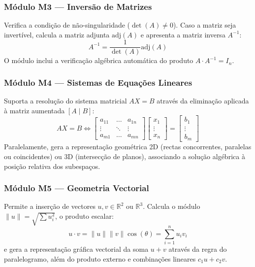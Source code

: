 \documentclass[conference]{IEEEtran}
\begin{document}
\subsubsection{Módulo M3 --- Inversão de Matrizes}
Verifica a condição de não-singularidade ($\det(A) \neq 0$). Caso a matriz seja invertível, calcula a matriz adjunta $\mathrm{adj}(A)$ e apresenta a matriz inversa $A^{-1}$:
\begin{equation}
A^{-1} = \frac{1}{\det(A)} \mathrm{adj}(A)
\label{eq:inversa}
\end{equation}
O módulo inclui a verificação algébrica automática do produto $A \cdot A^{-1} = I_n$.

\subsubsection{Módulo M4 --- Sistemas de Equações Lineares}
Suporta a resolução do sistema matricial $AX = B$ através da eliminação aplicada à matriz aumentada $[A \mid B]$:
\begin{equation}
AX = B \iff
\begin{bmatrix} a_{11} & \dots & a_{1n} \\ \vdots & \ddots & \vdots \\ a_{m1} & \dots & a_{mn} \end{bmatrix}
\begin{bmatrix} x_1 \\ \vdots \\ x_n \end{bmatrix} =
\begin{bmatrix} b_1 \\ \vdots \\ b_m \end{bmatrix}
\label{eq:sistema}
\end{equation}
Paralelamente, gera a representação geométrica 2D (rectas concorrentes, paralelas ou coincidentes) ou 3D (intersecção de planos), associando a solução algébrica à posição relativa dos subespaços.

\subsubsection{Módulo M5 --- Geometria Vectorial}
Permite a inserção de vectores $u, v \in \mathbb{R}^2$ ou $\mathbb{R}^3$. Calcula o módulo $\|u\| = \sqrt{\sum u_i^2}$, o produto escalar:
\begin{equation}
u \cdot v = \|u\|\|v\|\cos(\theta) = \sum_{i=1}^{n} u_i v_i
\label{eq:escalar}
\end{equation}
e gera a representação gráfica vectorial da soma $u+v$ através da regra do paralelogramo, além do produto externo e combinações lineares $c_1 u + c_2 v$.
\end{document}
